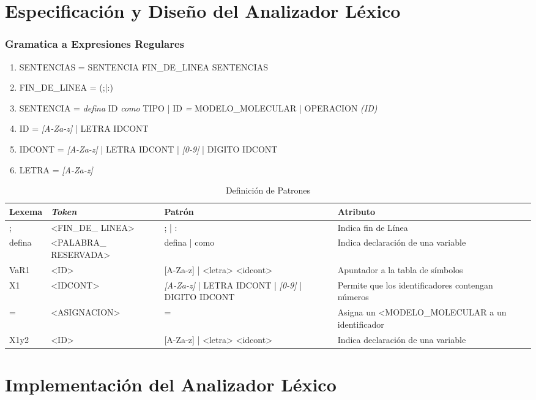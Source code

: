 \section{Especificación y Diseño del Analizador Léxico}

\subsubsection{Gramatica a Expresiones Regulares}

\begin{enumerate}
    \item SENTENCIAS = SENTENCIA FIN\_DE\_LINEA SENTENCIAS
    \item FIN\_DE\_LINEA = (;|:)
    \item SENTENCIA = \textit{defina} ID \textit{como} TIPO | ID \textit{=} MODELO\_MOLECULAR | OPERACION \textit{(\textnormal{ID})}
    \item ID = \textit{[A-Za-z]} | LETRA IDCONT
    \item IDCONT = \textit{[A-Za-z]} | LETRA IDCONT | \textit{[0-9]} | DIGITO IDCONT
    \item LETRA = \textit{[A-Za-z]}
\end{enumerate}

\begin{table}
    \footnotesize
    \begin{tabularx}{\linewidth}{|X|X|X|X|}
        \hline
        Lexema & \textit{Token}        & Patrón                                                            & Atributo                                          \\\hline
        ;      & <FIN\_DE\_ LINEA>     & ; | :                                                             & Indica fin de Línea                               \\\hline
        defina & <PALABRA\_ RESERVADA> & defina | como                                                     & Indica declaración de una variable                \\\hline
        VaR1   & <ID>                  & [A-Za-z] | <letra> <idcont>                                       & Apuntador a la tabla de símbolos                  \\\hline
        X1     & <IDCONT>              & \textit{[A-Za-z]} | LETRA IDCONT | \textit{[0-9]} | DIGITO IDCONT & Permite que los identificadores contengan números \\\hline
        =      & <ASIGNACION>          & =                                                                 & Asigna un <MODELO\_MOLECULAR a un identificador   \\\hline
        X1y2   & <ID>                  & [A-Za-z] | <letra> <idcont>                                       & Indica declaración de una variable                \\\hline
    \end{tabularx}
    \label{table: lexTable}
    \caption{Definición de Patrones}
\end{table}



\section{Implementación del Analizador Léxico}